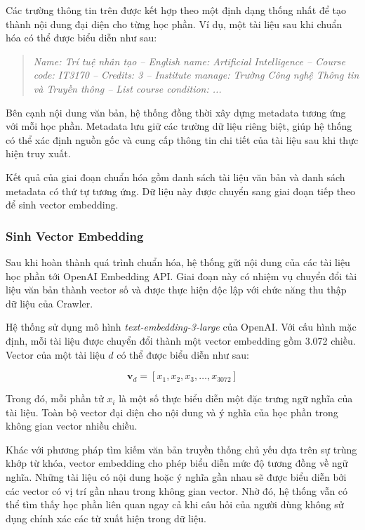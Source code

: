 \documentclass[../DoAn.tex]{subfiles}
\begin{document}
Các trường thông tin trên được kết hợp theo một định dạng thống nhất để tạo thành nội dung đại diện cho từng học phần. Ví dụ, một tài liệu sau khi chuẩn hóa có thể được biểu diễn như sau:

\begin{quote}
\textit{Name: Trí tuệ nhân tạo -- English name: Artificial Intelligence -- Course code: IT3170 -- Credits: 3 -- Institute manage: Trường Công nghệ Thông tin và Truyền thông -- List course condition: ...}
\end{quote}

Bên cạnh nội dung văn bản, hệ thống đồng thời xây dựng metadata tương ứng với mỗi học phần. Metadata lưu giữ các trường dữ liệu riêng biệt, giúp hệ thống có thể xác định nguồn gốc và cung cấp thông tin chi tiết của tài liệu sau khi thực hiện truy xuất.

Kết quả của giai đoạn chuẩn hóa gồm danh sách tài liệu văn bản và danh sách metadata có thứ tự tương ứng. Dữ liệu này được chuyển sang giai đoạn tiếp theo để sinh vector embedding.

\subsubsection{Sinh Vector Embedding}

Sau khi hoàn thành quá trình chuẩn hóa, hệ thống gửi nội dung của các tài liệu học phần tới OpenAI Embedding API. Giai đoạn này có nhiệm vụ chuyển đổi tài liệu văn bản thành vector số và được thực hiện độc lập với chức năng thu thập dữ liệu của Crawler.

Hệ thống sử dụng mô hình \textit{text-embedding-3-large} của OpenAI. Với cấu hình mặc định, mỗi tài liệu được chuyển đổi thành một vector embedding gồm 3.072 chiều. Vector của một tài liệu $d$ có thể được biểu diễn như sau:

\begin{equation}
    \mathbf{v}_{d} = [x_{1}, x_{2}, x_{3}, \ldots, x_{3072}]
\end{equation}

Trong đó, mỗi phần tử $x_i$ là một số thực biểu diễn một đặc trưng ngữ nghĩa của tài liệu. Toàn bộ vector đại diện cho nội dung và ý nghĩa của học phần trong không gian vector nhiều chiều.

Khác với phương pháp tìm kiếm văn bản truyền thống chủ yếu dựa trên sự trùng khớp từ khóa, vector embedding cho phép biểu diễn mức độ tương đồng về ngữ nghĩa. Những tài liệu có nội dung hoặc ý nghĩa gần nhau sẽ được biểu diễn bởi các vector có vị trí gần nhau trong không gian vector. Nhờ đó, hệ thống vẫn có thể tìm thấy học phần liên quan ngay cả khi câu hỏi của người dùng không sử dụng chính xác các từ xuất hiện trong dữ liệu.
\end{document}
